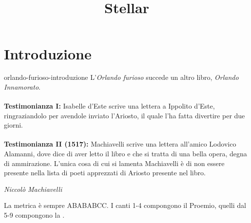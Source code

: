 \documentclass[preview]{standalone}
\begin{document}
\title{Stellar}
\genpage

\section{Introduzione}

\begin{snippet}{orlando-furioso-introduzione}
    L'\textit{Orlando furioso} succede un altro libro,
    \textit{Orlando Innamorato}.
    \\\\
    \textbf{Testimonianza I:} Isabelle d'Este scrive una lettera a Ippolito d'Este,
    ringraziandolo per avendole inviato l'Ariosto, il quale l'ha fatta
    divertire per due giorni.
    \\\\
    \textbf{Testimonianza II (1517):}  Machiavelli scrive una lettera all'amico
    Lodovico Alamanni, dove dice di aver letto il libro e
    che si tratta di una bella opera, degna di ammirazione.
    L'unica cosa di cui si lamenta Machiavelli è di non essere presente nella lista di
    poeti apprezzati di Ariosto presente nel libro.
    
    \epigraph{}
    {\textit{Niccolò Machiavelli}}
    
    
    La metrica è sempre ABABABCC.
    I canti 1-4 compongono il Proemio, quelli dal 5-9 compongono la .
\end{snippet}
\end{document}
